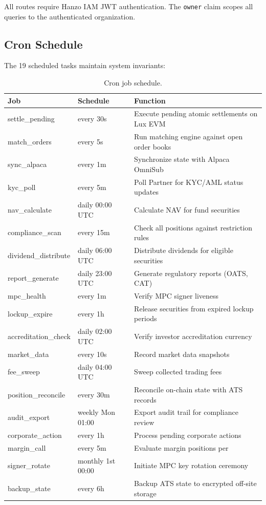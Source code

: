 \documentclass[11pt,a4paper]{article}
\begin{document}
All routes require Hanzo IAM JWT authentication. The \texttt{owner} claim scopes all queries to the authenticated organization.

\subsection{Cron Schedule}

The 19 scheduled tasks maintain system invariants:

\begin{table}[H]
\centering
\caption{Cron job schedule.}
\label{tab:crons}
\begin{tabular}{llp{5.5cm}}
\toprule
\textbf{Job} & \textbf{Schedule} & \textbf{Function} \\
\midrule
settle\_pending & every 30s & Execute pending atomic settlements on Lux EVM \\
match\_orders & every 5s & Run matching engine against open order books \\
sync\_alpaca & every 1m & Synchronize state with Alpaca OmniSub \\
kyc\_poll & every 5m & Poll Partner for KYC/AML status updates \\
nav\_calculate & daily 00:00 UTC & Calculate NAV for fund securities \\
compliance\_scan & every 15m & Check all positions against restriction rules \\
dividend\_distribute & daily 06:00 UTC & Distribute dividends for eligible securities \\
report\_generate & daily 23:00 UTC & Generate regulatory reports (OATS, CAT) \\
mpc\_health & every 1m & Verify MPC signer liveness \\
lockup\_expire & every 1h & Release securities from expired lockup periods \\
accreditation\_check & daily 02:00 UTC & Verify investor accreditation currency \\
market\_data & every 10s & Record market data snapshots \\
fee\_sweep & daily 04:00 UTC & Sweep collected trading fees \\
position\_reconcile & every 30m & Reconcile on-chain state with ATS records \\
audit\_export & weekly Mon 01:00 & Export audit trail for compliance review \\
corporate\_action & every 1h & Process pending corporate actions \\
margin\_call & every 5m & Evaluate margin positions per \cite{lux-credit-protocol-spec} \\
signer\_rotate & monthly 1st 00:00 & Initiate MPC key rotation ceremony \\
backup\_state & every 6h & Backup ATS state to encrypted off-site storage \\
\bottomrule
\end{tabular}
\end{table}
\end{document}
